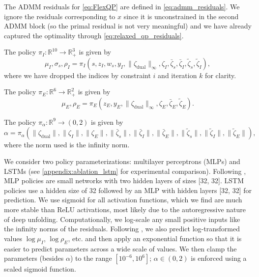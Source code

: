 \documentclass{article} %
\def\sR{{\mathbb{R}}}
\begin{document}
The ADMM residuals for \cref{eq:FlexQP} are defined in \cref{eq:admm_residuals}.
We ignore the residuals corresponding to $x$ since it is unconstrained in the second ADMM block (so the primal residual is not very meaningful) and we have already captured the optimality through \cref{eq:relaxed_qp_residuals}.

The policy $\pi_I: \sR^{10} \to \sR_+^3$ is given by
\begin{equation}
    \mu_I, \sigma_s, \rho_I = \pi_I(s, z_I, w_s, y_I, \lVert \zeta_\text{dual} \rVert_\infty, \zeta_I, \bar{\zeta}_s, \bar{\zeta}_I, \tilde{\zeta}_s, \tilde{\zeta}_I),
\end{equation}
where we have dropped the indices by constraint $i$ and iteration $k$ for clarity.

The policy $\pi_E: \sR^6 \to \sR_+^2$ is given by
\begin{equation}
    \mu_E, \rho_E = \pi_E(z_E, y_E, \lVert \zeta_\text{dual} \rVert_\infty, \zeta_E, \bar{\zeta}_E, \tilde{\zeta}_E).
\end{equation}

The policy $\pi_\alpha: \sR^9 \to (0, 2)$ is given by
\begin{equation}
    \alpha = \pi_\alpha(\lVert \zeta_\text{dual} \rVert, \lVert \zeta_I \rVert, \lVert \zeta_E \rVert, \lVert \bar{\zeta}_s \rVert, \lVert \bar{\zeta}_I \rVert, \lVert \bar{\zeta}_E \rVert, \lVert \tilde{\zeta}_s \rVert, \lVert \tilde{\zeta}_I \rVert, \lVert \tilde{\zeta}_E \rVert),
\end{equation}
where the norm used is the infinity norm.

We consider two policy parameterizations: multilayer perceptrons (MLPs) and LSTMs (see \cref{appendix:ablation_lstm} for experimental comparison). Following \citet{saravanos2025deep}, MLP policies are small networks with two hidden layers of sizes [32, 32]. LSTM policies use a hidden size of 32 followed by an MLP with hidden layers [32, 32] for prediction. We use sigmoid for all activation functions, which we find are much more stable than ReLU activations, most likely due to the autoregressive nature of deep unfolding.
Computationally, we log-scale any small positive inputs like the infinity norms of the residuals. Following \citet{ichnowski2021accelerating}, we also predict log-transformed values $\log \mu_I$, $\log\rho_E$, etc. and then apply an exponential function so that it is easier to predict parameters across a wide scale of values. We then clamp the parameters (besides $\alpha$) to the range $[10^{-6}, 10^6]$; $\alpha \in (0, 2)$ is enforced using a scaled sigmoid function.
\end{document}
